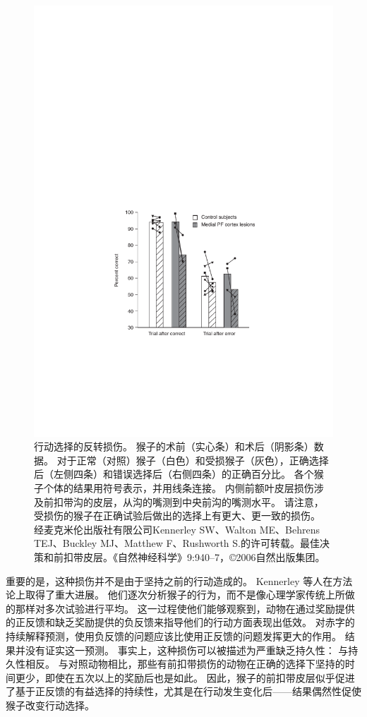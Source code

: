 \begin{figure}[!htb]
	\centering
 	\includegraphics{chap3/3_8}
	\caption{行动选择的反转损伤。
		猴子的术前（实心条）和术后（阴影条）数据。
		对于正常（对照）猴子（白色）和受损猴子（灰色），正确选择后（左侧四条）和错误选择后（右侧四条）的正确百分比。
		各个猴子个体的结果用符号表示，并用线条连接。
		内侧前额叶皮层损伤涉及前扣带沟的皮层，从沟的嘴测到中央前沟的嘴测水平。
		请注意，受损伤的猴子在正确试验后做出的选择上有更大、更一致的损伤。
		经麦克米伦出版社有限公司Kennerley SW、Walton ME、Behrens TEJ、Buckley MJ、Matthew F、Rushworth S.的许可转载。最佳决策和前扣带皮层。《自然神经科学》9:940–7，©2006自然出版集团。}
	\label{fig:3_8}
\end{figure}


重要的是，这种损伤并不是由于坚持之前的行动造成的。
Kennerley 等人在方法论上取得了重大进展。
他们逐次分析猴子的行为，而不是像心理学家传统上所做的那样对多次试验进行平均。
这一过程使他们能够观察到，动物在通过奖励提供的正反馈和缺乏奖励提供的负反馈来指导他们的行动方面表现出低效。
对赤字的持续解释预测，使用负反馈的问题应该比使用正反馈的问题发挥更大的作用。
结果并没有证实这一预测。
事实上，这种损伤可以被描述为严重缺乏持久性：
与持久性相反。
与对照动物相比，那些有前扣带损伤的动物在正确的选择下坚持的时间更少，即使在五次以上的奖励后也是如此。
因此，猴子的前扣带皮层似乎促进了基于正反馈的有益选择的持续性，尤其是在行动发生变化后——结果偶然性促使猴子改变行动选择。\par


